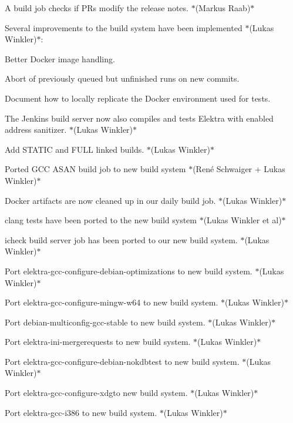 \begin{DoxyItemize}
\item A build job checks if P\+Rs modify the release notes. $\ast$(Markus Raab)$\ast$
\item Several improvements to the build system have been implemented $\ast$(Lukas Winkler)$\ast$\+:
\begin{DoxyItemize}
\item Better Docker image handling.
\item Abort of previously queued but unfinished runs on new commits.
\item Document how to locally replicate the Docker environment used for tests.
\end{DoxyItemize}
\item The Jenkins build server now also compiles and tests Elektra with enabled address sanitizer. $\ast$(Lukas Winkler)$\ast$
\item Add {\ttfamily S\+T\+A\+T\+IC} and {\ttfamily F\+U\+LL} linked builds. $\ast$(Lukas Winkler)$\ast$
\item Ported G\+CC A\+S\+AN build job to new build system $\ast$(René Schwaiger + Lukas Winkler)$\ast$
\item Docker artifacts are now cleaned up in our daily build job. $\ast$(Lukas Winkler)$\ast$
\item {\ttfamily clang} tests have been ported to the new build system $\ast$(Lukas Winkler et al)$\ast$
\item {\ttfamily icheck} build server job has been ported to our new build system. $\ast$(Lukas Winkler)$\ast$
\item Port {\ttfamily elektra-\/gcc-\/configure-\/debian-\/optimizations} to new build system. $\ast$(Lukas Winkler)$\ast$
\item Port {\ttfamily elektra-\/gcc-\/configure-\/mingw-\/w64} to new build system. $\ast$(Lukas Winkler)$\ast$
\item Port {\ttfamily debian-\/multiconfig-\/gcc-\/stable} to new build system. $\ast$(Lukas Winkler)$\ast$
\item Port {\ttfamily elektra-\/ini-\/mergerequests} to new build system. $\ast$(Lukas Winkler)$\ast$
\item Port {\ttfamily elektra-\/gcc-\/configure-\/debian-\/nokdbtest} to new build system. $\ast$(Lukas Winkler)$\ast$
\item Port {\ttfamily elektra-\/gcc-\/configure-\/xdg}to new build system. $\ast$(Lukas Winkler)$\ast$
\item Port {\ttfamily elektra-\/gcc-\/i386} to new build system. $\ast$(Lukas Winkler)$\ast$

\end{DoxyItemize}
